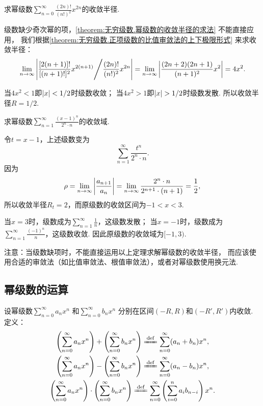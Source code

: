 \begin{example}
求幂级数\(\sum\limits_{n=0}^\infty \frac{(2n)!}{(n!)^2} x^{2n}\)的收敛半径.
\begin{solution}
级数缺少奇次幂的项，\cref{theorem:无穷级数.幂级数的收敛半径的求法} 不能直接应用，
我们根据\cref{theorem:无穷级数.正项级数的比值审敛法的上下极限形式} 来求收敛半径：
\[
\lim\limits_{n\to\infty} \abs{{\frac{[2(n+1)]!}{[(n+1)!]^2} x^{2(n+1)}}\Bigg/{\frac{(2n)!}{(n!)^2} x^{2n}}}
= \lim\limits_{n\to\infty} \abs{\frac{(2n+2)(2n+1)}{(n+1)^2} x^2}
= 4 x^2.
\]

当\(4 x^2 < 1\)即\(\abs{x} < 1/2\)时级数收敛；
当\(4 x^2 > 1\)即\(\abs{x} > 1/2\)时级数发散.
所以收敛半径\(R = 1/2\).
\end{solution}
\end{example}

\begin{example}
求幂级数\(\sum\limits_{n=1}^\infty \frac{(x-1)^n}{2^n \cdot n}\)的收敛域.
\begin{solution}
令\(t = x-1\)，上述级数变为\[
\sum\limits_{n=1}^\infty \frac{t^n}{2^n \cdot n}.
\]因为\[
\rho = \lim\limits_{n\to\infty} \abs{\frac{a_{n+1}}{a_n}} = \lim\limits_{n\to\infty} \frac{2^n \cdot n}{2^{n+1} \cdot (n+1)} = \frac{1}{2},
\]所以收敛半径\(R_t = 2\)，而原级数的收敛区间为\(-1<x<3\).

当\(x=3\)时，级数成为\(\sum\limits_{n=1}^\infty \frac{1}{n}\)，这级数发散；
当\(x=-1\)时，级数成为\(\sum\limits_{n=1}^\infty \frac{(-1)^n}{n}\)，这级数收敛.
因此原级数的收敛域为\([-1,3)\).
\end{solution}
\end{example}

注意：当级数缺项时，不能直接运用以上定理求解幂级数的收敛半径，
而应该使用合适的审敛法（如比值审敛法、根值审敛法），或者对幂级数使用换元法.

\subsection{幂级数的运算}
\begin{definition}
设幂级数\(\sum\limits_{n=0}^\infty a_n x^n\)
和\(\sum\limits_{n=0}^\infty b_n x^n\)
分别在区间\((-R,R)\)和\((-R',R')\)内收敛.
定义：
\begin{gather}
	\left(\sum\limits_{n=0}^\infty a_n x^n\right)
	+ \left(\sum\limits_{n=0}^\infty b_n x^n\right)
	\defeq
	\sum\limits_{n=0}^\infty (a_n+b_n) x^n, \\
	\left(\sum\limits_{n=0}^\infty a_n x^n\right)
	- \left(\sum\limits_{n=0}^\infty b_n x^n\right)
	\defeq
	\sum\limits_{n=0}^\infty (a_n-b_n) x^n, \\
	\left(\sum\limits_{n=0}^\infty a_n x^n\right)
	\cdot \left(\sum\limits_{n=0}^\infty b_n x^n\right)
	\defeq
	\sum\limits_{n=0}^\infty \left(
		\sum\limits_{i=0}^n a_i b_{n-i}
	\right) x^n.
\end{gather}
\end{definition}

